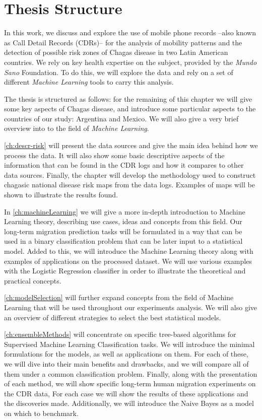 \section{Thesis Structure}

In this work, we discuss and explore the use of mobile phone records --also known as Call Detail Records (CDRs)-- for the analysis of mobility patterns and the detection of possible risk zones of Chagas disease in two Latin American countries. 
We rely on key health expertise on the subject, provided by the \textit{Mundo Sano} Foundation. 
To do this, we will explore the data and rely on a set of different \textit{Machine Learning} tools to carry this analysis.

The thesis is structured as follows: for the remaining of this chapter we will give some key aspects of Chagas disease, and introduce some particular aspects to the countries of our study: Argentina and Mexico. 
We will also give a very brief overview into to the field of \textit{Machine Learning}.

\cref{ch:descr-risk} will present the data sources and give the main idea behind how we process the data. 
It will also show some basic descriptive aspects of the information that can be found in the CDR logs and how it compares to other data sources. 
Finally, the chapter will develop the methodology used to construct chagasic national disease risk maps from the data logs.
Examples of maps will be shown to illustrate the results found.

In \cref{ch:machineLearning} we will give a more in-depth introduction to Machine Learning theory, describing use cases, ideas and concepts from this field.
Our long-term migration prediction tasks will be formulated in a way that can be used in a binary classification problem that can be later input to a statistical model.
Added to this, we will introduce the Machine Learning theory along with examples of applications on the processed dataset. 
We will use various examples with the Logistic Regression classifier in order to illustrate the theoretical and practical concepts.

\cref{ch:modelSelection} will further expand concepts from the field of Machine Learning that will be used throughout our experiments analysis.
We will also give an overview of different strategies to select the best statistical models.

\cref{ch:ensembleMethods} will concentrate on specific tree-based algorithms for Supervised Machine Learning Classification tasks.
We will introduce the minimal formulations for the models, as well as applications on them.
For each of these, we will dive into their main benefits and drawbacks, and we will compare all of them under a common classification problem.
Finally, along with the presentation of each method, we will show specific long-term human migration experiments on the CDR data,
For each case we will show the results of these applications and the discoveries made.
Additionally, we will introduce the Naive Bayes as a model on which to benchmark.

